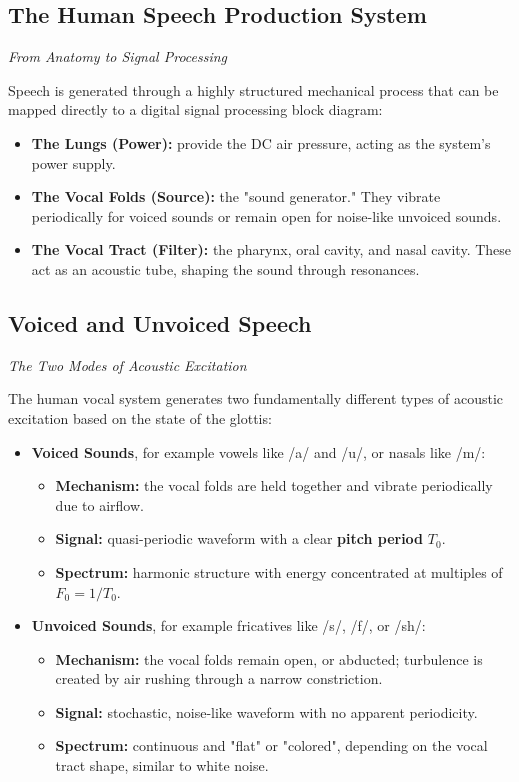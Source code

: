 \subsection{The Human Speech Production System}

\textit{From Anatomy to Signal Processing}

Speech is generated through a highly structured mechanical process that can be mapped directly to a digital signal processing block diagram:

\begin{itemize}
\item \textbf{The Lungs (Power):} provide the DC air pressure, acting as the system's power supply.
\item \textbf{The Vocal Folds (Source):} the "sound generator." They vibrate periodically for voiced sounds or remain open for noise-like unvoiced sounds.
\item \textbf{The Vocal Tract (Filter):} the pharynx, oral cavity, and nasal cavity. These act as an acoustic tube, shaping the sound through resonances.
\end{itemize}

\subsection{Voiced and Unvoiced Speech}

\textit{The Two Modes of Acoustic Excitation}

The human vocal system generates two fundamentally different types of acoustic excitation based on the state of the glottis:

\begin{itemize}
\item \textbf{Voiced Sounds}, for example vowels like /a/ and /u/, or nasals like /m/:
\begin{itemize}
\item \textbf{Mechanism:} the vocal folds are held together and vibrate periodically due to airflow.
\item \textbf{Signal:} quasi-periodic waveform with a clear \textbf{pitch period} $T_0$.
\item \textbf{Spectrum:} harmonic structure with energy concentrated at multiples of $F_0 = 1/T_0$.
\end{itemize}
\item \textbf{Unvoiced Sounds}, for example fricatives like /s/, /f/, or /sh/:
\begin{itemize}
\item \textbf{Mechanism:} the vocal folds remain open, or abducted; turbulence is created by air rushing through a narrow constriction.
\item \textbf{Signal:} stochastic, noise-like waveform with no apparent periodicity.
\item \textbf{Spectrum:} continuous and "flat" or "colored", depending on the vocal tract shape, similar to white noise.
\end{itemize}
\end{itemize}

